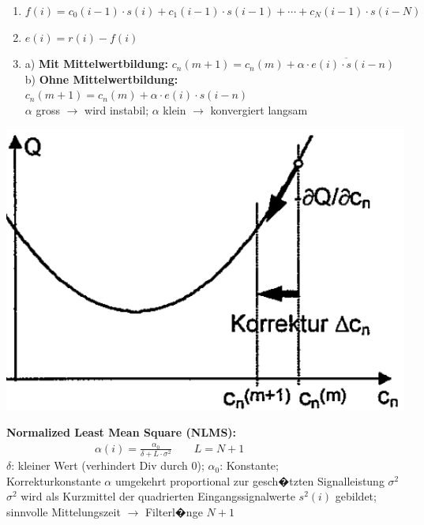 \begin{minipage}{0.7\linewidth}
\begin{enumerate}
 \item $f(i) = c_0(i-1)\cdot s(i) + c_1(i-1) \cdot s(i -1) + \cdots + c_N(i-1) \cdot s(i-N)$
 \item $e(i) = r(i) - f(i)$
 \item a) \textbf{Mit Mittelwertbildung:} \hspace{0.4025cm} $c_n(m+1)=c_n(m) + \overline{\alpha\cdot e(i) \cdot s(i-n)}$\\
			 b) \textbf{Ohne Mittelwertbildung:} \hspace{0.1cm} $c_n(m+1)=c_n(m) + \alpha\cdot e(i) \cdot s(i-n)$\\
			$\alpha$ gross $\rightarrow$ wird instabil; $\alpha$ klein $\rightarrow$ konvergiert langsam
\end{enumerate}
\end{minipage}
\begin{minipage}{0.3\linewidth}
	\includegraphics[width=\textwidth]{Content/AdaptSigVer/lmsAlgorithmus.png}
\end{minipage}
\textbf{Normalized Least Mean Square (NLMS):} $\qquad \qquad \qquad \qquad \alpha(i) = \frac{\alpha_0}{\delta + L \cdot \sigma^2} \qquad L=N+1$\\
$\delta$: kleiner Wert (verhindert Div durch 0); $\alpha_0$: Konstante;\\ 
Korrekturkonstante $\alpha$ umgekehrt proportional zur gesch�tzten Signalleistung $\sigma^2$\\
$\sigma^2$ wird als Kurzmittel der quadrierten Eingangssignalwerte $s^2(i)$ gebildet; sinnvolle Mittelungszeit $\rightarrow$ Filterl�nge $N+1$

